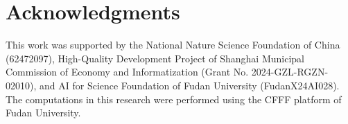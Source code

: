 \section*{Acknowledgments}
This work was supported by the National Nature Science Foundation of China (62472097), High-Quality Development Project of Shanghai Municipal Commission of Economy and Informatization (Grant No. 2024-GZL-RGZN-02010), and AI for Science Foundation of Fudan University (FudanX24AI028). The computations in this research were performed using the CFFF platform of Fudan University.
